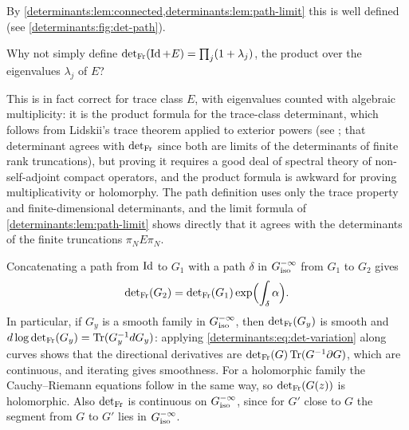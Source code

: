 By \cref{determinants:lem:connected,determinants:lem:path-limit} this is well
defined (see \cref{determinants:fig:det-path}).

\begin{question}
Why not simply define $\operatorname{det}_{\mathrm{Fr}}(\operatorname{Id}+E)=\prod_j(1+\lambda_j)$, the product
over the eigenvalues $\lambda_j$ of $E$?
\end{question}
\begin{answer}
This is in fact correct for trace class $E$, with eigenvalues counted with
algebraic multiplicity: it is the product formula for the trace-class
determinant, which follows from Lidskii's trace theorem applied to exterior
powers (see \cite[Chapter~3]{Simon-trace}; that determinant agrees with
$\operatorname{det}_{\mathrm{Fr}}$ since both are limits of the determinants of finite rank
truncations), but
proving it requires a good deal of spectral theory of non-self-adjoint
compact operators, and the product formula is awkward for proving
multiplicativity or holomorphy. The path definition uses only the trace
property and finite-dimensional determinants, and the limit formula of
\cref{determinants:lem:path-limit} shows directly that it agrees with the
determinants of the finite truncations $\pi_NE\pi_N$.
\end{answer}

\noindent Concatenating a path from $\operatorname{Id}$ to $G_1$ with a path $\delta$ in
$G^{-\infty}_{\mathrm{iso}}$ from $G_1$ to $G_2$ gives
\begin{equation}\label{determinants:eq:det-variation}
  \operatorname{det}_{\mathrm{Fr}}(G_2)=\operatorname{det}_{\mathrm{Fr}}(G_1)\exp\Bigl(\int_\delta\alpha\Bigr).
\end{equation}
In particular, if $G_y$ is a smooth family in $G^{-\infty}_{\mathrm{iso}}$, then
$\operatorname{det}_{\mathrm{Fr}}(G_y)$ is smooth and $d\log\operatorname{det}_{\mathrm{Fr}}(G_y)=\operatorname{Tr}(G_y^{-1}dG_y)$: applying
\eqref{determinants:eq:det-variation} along curves shows that the directional
derivatives are $\operatorname{det}_{\mathrm{Fr}}(G)\operatorname{Tr}(G^{-1}\partial G)$, which are continuous, and
iterating gives smoothness. For a holomorphic family the Cauchy--Riemann
equations follow in the same way, so $\operatorname{det}_{\mathrm{Fr}}(G(z))$ is holomorphic. Also
$\operatorname{det}_{\mathrm{Fr}}$ is continuous on $G^{-\infty}_{\mathrm{iso}}$, since for $G'$ close to $G$ the
segment from $G$ to $G'$ lies in $G^{-\infty}_{\mathrm{iso}}$.


